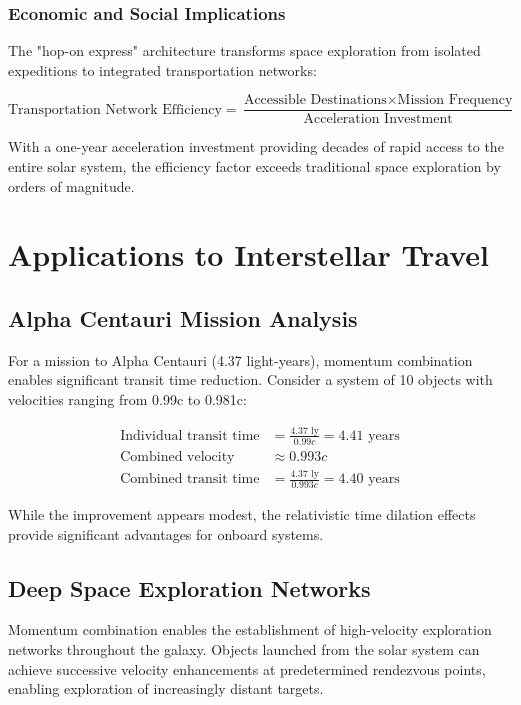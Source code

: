 \documentclass[11pt,a4paper]{article}
\theoremstyle{remark}
\begin{document}
\subsubsection{Economic and Social Implications}

The "hop-on express" architecture transforms space exploration from isolated expeditions to integrated transportation networks:

\begin{equation}
\text{Transportation Network Efficiency} = \frac{\text{Accessible Destinations} \times \text{Mission Frequency}}{\text{Acceleration Investment}}
\end{equation}

With a one-year acceleration investment providing decades of rapid access to the entire solar system, the efficiency factor exceeds traditional space exploration by orders of magnitude.

\section{Applications to Interstellar Travel}

\subsection{Alpha Centauri Mission Analysis}

For a mission to Alpha Centauri (4.37 light-years), momentum combination enables significant transit time reduction. Consider a system of 10 objects with velocities ranging from 0.99c to 0.981c:

\begin{align}
\text{Individual transit time} &= \frac{4.37 \text{ ly}}{0.99c} = 4.41 \text{ years} \\
\text{Combined velocity} &\approx 0.993c \\
\text{Combined transit time} &= \frac{4.37 \text{ ly}}{0.993c} = 4.40 \text{ years}
\end{align}

While the improvement appears modest, the relativistic time dilation effects provide significant advantages for onboard systems.

\subsection{Deep Space Exploration Networks}

Momentum combination enables the establishment of high-velocity exploration networks throughout the galaxy. Objects launched from the solar system can achieve successive velocity enhancements at predetermined rendezvous points, enabling exploration of increasingly distant targets.
\end{document}
